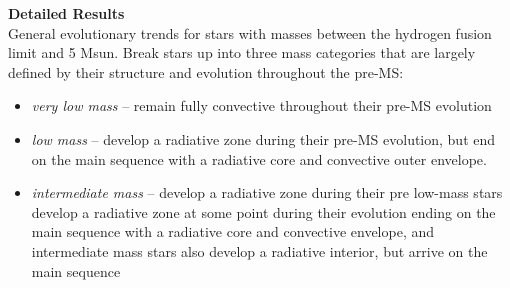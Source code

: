 \textbf{Detailed Results} \\
General evolutionary trends for stars with masses between the hydrogen fusion limit and 5 Msun. Break stars up into three mass categories that are largely defined by their structure and evolution throughout the pre-MS: 
\begin{itemize}
 \item[] {\it very low mass} -- remain fully convective throughout their pre-MS evolution
 \item[] {\it low mass} -- develop a radiative zone during their pre-MS evolution, but end on the main sequence with a radiative core and convective outer envelope.
 \item[] {\it intermediate mass} -- develop a radiative zone during their pre
low-mass stars develop a radiative zone at some point during their evolution ending on the main sequence with a radiative core and convective envelope, and intermediate mass stars also develop a radiative interior, but arrive on the main sequence
\end{itemize}